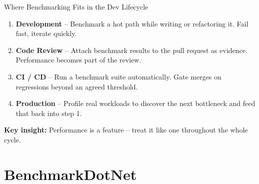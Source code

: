 \documentclass[aspectratio=1610, xcolor=table]{beamer}
\begin{document}
\begin{frame}{Where Benchmarking Fits in the Dev Lifecycle}
	\begin{enumerate}
		\item \textbf{Development} -- Benchmark a hot path while writing or
		      refactoring it. Fail fast, iterate quickly.

		      \vspace{0.5em}
		\item \textbf{Code Review} -- Attach benchmark results to the pull request
		      as evidence. Performance becomes part of the review.

		      \vspace{0.5em}
		\item \textbf{CI / CD} -- Run a benchmark suite automatically.
		      Gate merges on regressions beyond an agreed threshold.

		      \vspace{0.5em}
		\item \textbf{Production} -- Profile real workloads to discover the next
		      bottleneck and feed that back into step 1.
	\end{enumerate}

	\vspace{1em}
	{\textcolor{SecondaryAccent}{\textbf{Key insight:}}}
	Performance is a feature -- treat it like one throughout the whole cycle.
\end{frame}


\section{BenchmarkDotNet}
\end{document}
